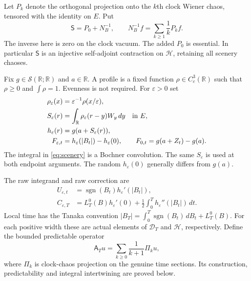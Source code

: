 \documentclass[11pt]{article}
\newcommand{\R}{\mathbb R}
\newcommand{\HH}{\mathcal H}
\newcommand{\DD}{\mathcal D}
\newcommand{\Smo}{\mathsf S}
\newcommand{\Reg}{\mathsf A}
\begin{document}
Let $P_k$ denote the orthogonal projection onto the $k$th clock Wiener
chaos, tensored with the identity on $E$. Put
\begin{equation}\label{eq:smooth}
 \Smo=P_0+N_B^{-1},\qquad
 N_B^{-1}f=\sum_{k\geq1}\frac1k P_kf.
\end{equation}
The inverse here is zero on the clock vacuum. The added $P_0$ is
essential. In particular $\Smo$ is an injective self-adjoint contraction
on $\HH$, retaining all scenery chaoses.

Fix $g\in\mathcal S(\R;\R)$ and $a\in\R$. A profile is a fixed function
$\rho\in C_c^3(\R)$ such that $\rho\geq0$ and $\int\rho=1$.
Evenness is not required. For $\varepsilon>0$ set
\begin{align}
 \rho_\varepsilon(x)&=\varepsilon^{-1}\rho(x/\varepsilon),\nonumber\\
 S_\varepsilon(r)&=\int_\R\rho_\varepsilon(r-y)W_y\,dy\quad\hbox{in }E,\label{eq:scenery}\\
 h_\varepsilon(r)&=g(a+S_\varepsilon(r)),\nonumber\\
 F_{\varepsilon,t}&=h_\varepsilon(|B_t|)-h_\varepsilon(0),\qquad
 F_{0,t}=g(a+Z_t)-g(a).\label{eq:endpoint}
\end{align}
The integral in \eqref{eq:scenery} is a Bochner convolution. The same
$S_\varepsilon$ is used at both endpoint arguments. The random
$h_\varepsilon(0)$ generally differs from $g(a)$.

The raw integrand and raw correction are
\begin{align}
 U_{\varepsilon,t}
  &=\operatorname{sgn}(B_t)h_\varepsilon'(|B_t|),\label{eq:rawu}\\
 C_{\varepsilon,T}
  &=L_T^0(B)h_\varepsilon'(0)
       +\frac12\int_0^T h_\varepsilon''(|B_t|)\,dt.\label{eq:rawc}
\end{align}
Local time has the Tanaka convention
$|B_T|=\int_0^T\operatorname{sgn}(B_t)\,dB_t+L_T^0(B)$.
For each positive width these are actual elements of $\DD_T$ and
$\HH$, respectively. Define the bounded predictable operator
\begin{equation}\label{eq:A}
 \Reg_Tu=\sum_{k\geq0}\frac1{k+1}\Pi_ku,
\end{equation}
where $\Pi_k$ is clock-chaos projection on the genuine time sections.
Its construction, predictability and integral intertwining are proved below.
\end{document}

